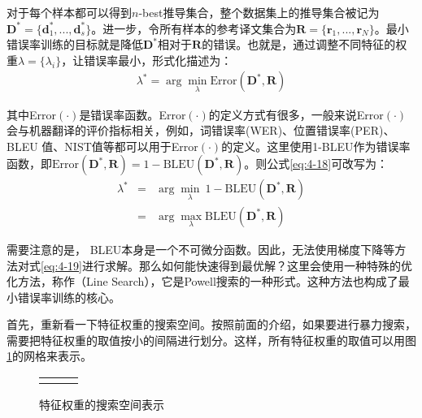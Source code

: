 \parinterval 对于每个样本都可以得到$n$-best推导集合，整个数据集上的推导集合被记为$\mathbf{D}^{\ast} = \{\mathbf{d}_{1}^{\ast},...,\mathbf{d}_{s}^{\ast}\}$。进一步，令所有样本的参考译文集合为$\mathbf{R} = \{\mathbf{r}_1,...,\mathbf{r}_N\}$。最小错误率训练的目标就是降低$\mathbf{D}^{\ast}$相对于$\mathbf{R}$的错误。也就是，通过调整不同特征的权重$\lambda = \{ \lambda_i \}$，让错误率最小，形式化描述为：
\begin{eqnarray}
\lambda^{\ast} = \arg\min_{\lambda} \textrm{Error}(\mathbf{D}^{\ast},\mathbf{R})
\label{eq:4-18}
\end{eqnarray}

\noindent 其中\textrm{Error}$(\cdot)$是错误率函数。\textrm{Error}$(\cdot)$的定义方式有很多，一般来说\textrm{Error}$(\cdot)$会与机器翻译的评价指标相关，例如，词错误率(WER)、位置错误率(PER)、BLEU 值、NIST值等都可以用于\textrm{Error}$(\cdot)$的定义。这里使用1-BLEU作为错误率函数，即$\textrm{Error}(\mathbf{D}^{\ast},\mathbf{R}) = 1 - \textrm{BLEU}(\mathbf{D}^{\ast},\mathbf{R})$。则公式\ref{eq:4-18}可改写为：
\begin{eqnarray}
\lambda^{\ast} &=& \arg\min_{\lambda}\ 1 - \textrm{BLEU}(\mathbf{D}^{\ast},\mathbf{R})   \nonumber \\
&=& \arg\max_{\lambda} \textrm{BLEU}(\mathbf{D}^{\ast},\mathbf{R})
\label{eq:4-19}
\end{eqnarray}

\parinterval 需要注意的是， BLEU本身是一个不可微分函数。因此，无法使用梯度下降等方法对式\ref{eq:4-19}进行求解。那么如何能快速得到最优解？这里会使用一种特殊的优化方法，称作{\small{}}（Line Search），它是Powell搜索的一种形式\cite{powell1964an}。这种方法也构成了最小错误率训练的核心。

\parinterval 首先，重新看一下特征权重的搜索空间。按照前面的介绍，如果要进行暴力搜索，需要把特征权重的取值按小的间隔进行划分。这样，所有特征权重的取值可以用图\ref{fig:4-23}的网格来表示。

\begin{figure}[htp]
\centering
\begin{tabular}{l l l}
& \subfigure{} \subfigure{} \subfigure{} &  \\
\end{tabular}
\caption{特征权重的搜索空间表示}
\label{fig:4-23}
\end{figure}

